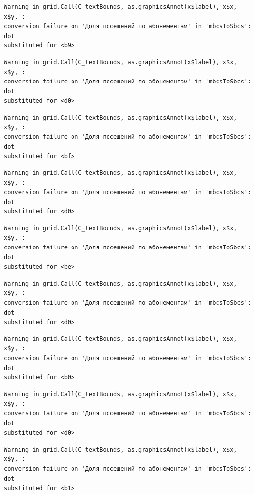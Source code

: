\documentclass[
  letterpaper,
  DIV=11,
  numbers=noendperiod]{scrartcl}
\begin{document}
\begin{verbatim}
Warning in grid.Call(C_textBounds, as.graphicsAnnot(x$label), x$x, x$y, :
conversion failure on 'Доля посещений по абонементам' in 'mbcsToSbcs': dot
substituted for <b9>
\end{verbatim}

\begin{verbatim}
Warning in grid.Call(C_textBounds, as.graphicsAnnot(x$label), x$x, x$y, :
conversion failure on 'Доля посещений по абонементам' in 'mbcsToSbcs': dot
substituted for <d0>
\end{verbatim}

\begin{verbatim}
Warning in grid.Call(C_textBounds, as.graphicsAnnot(x$label), x$x, x$y, :
conversion failure on 'Доля посещений по абонементам' in 'mbcsToSbcs': dot
substituted for <bf>
\end{verbatim}

\begin{verbatim}
Warning in grid.Call(C_textBounds, as.graphicsAnnot(x$label), x$x, x$y, :
conversion failure on 'Доля посещений по абонементам' in 'mbcsToSbcs': dot
substituted for <d0>
\end{verbatim}

\begin{verbatim}
Warning in grid.Call(C_textBounds, as.graphicsAnnot(x$label), x$x, x$y, :
conversion failure on 'Доля посещений по абонементам' in 'mbcsToSbcs': dot
substituted for <be>
\end{verbatim}

\begin{verbatim}
Warning in grid.Call(C_textBounds, as.graphicsAnnot(x$label), x$x, x$y, :
conversion failure on 'Доля посещений по абонементам' in 'mbcsToSbcs': dot
substituted for <d0>
\end{verbatim}

\begin{verbatim}
Warning in grid.Call(C_textBounds, as.graphicsAnnot(x$label), x$x, x$y, :
conversion failure on 'Доля посещений по абонементам' in 'mbcsToSbcs': dot
substituted for <b0>
\end{verbatim}

\begin{verbatim}
Warning in grid.Call(C_textBounds, as.graphicsAnnot(x$label), x$x, x$y, :
conversion failure on 'Доля посещений по абонементам' in 'mbcsToSbcs': dot
substituted for <d0>
\end{verbatim}

\begin{verbatim}
Warning in grid.Call(C_textBounds, as.graphicsAnnot(x$label), x$x, x$y, :
conversion failure on 'Доля посещений по абонементам' in 'mbcsToSbcs': dot
substituted for <b1>
\end{verbatim}
\end{document}
